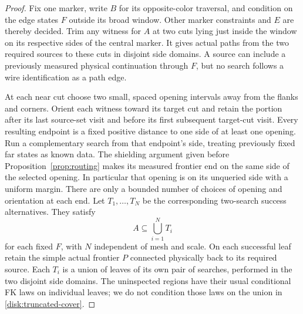 \begin{proof}
Fix one marker, write $B$ for its opposite-color traversal, and
condition on the edge states $F$ outside its broad window. Other
marker constraints and $E$ are thereby decided. Trim any witness
for $A$ at two cuts lying just inside the window on its respective
sides of the central marker. It gives actual paths from the two
required sources to these cuts in disjoint side domains. A source
can include a previously measured physical continuation through
$F$, but no search follows a wire identification as a path edge.

At each near cut choose two small, spaced opening intervals away
from the flanks and corners. Orient each witness toward its target
cut and retain the portion after its last source-set visit and before
its first subsequent target-cut visit. Every resulting endpoint is
a fixed positive distance to one side of at least one opening.
Run a complementary search from that endpoint's side, treating
previously fixed far states as known data. The shielding argument
given before Proposition~\ref{prop:routing} makes its measured
frontier end on the same side of the selected opening. In
particular that opening is on its unqueried side with a uniform
margin. There are only a bounded number of choices of opening and
orientation at each end. Let $T_1,\ldots,T_N$ be the corresponding
two-search success alternatives. They satisfy
\begin{equation}\label{disk:truncated-cover}
       A\subseteq\bigcup_{i=1}^N T_i
\end{equation}
for each fixed $F$, with $N$ independent of mesh and scale. On each
successful leaf retain the simple actual frontier $P$ connected
physically back to its required source. Each $T_i$ is a union of leaves
of its own pair of searches, performed in the two disjoint side
domains. The uninspected regions have their usual conditional FK laws
on individual leaves; we do not condition those laws on the union in
\eqref{disk:truncated-cover}.


\end{proof}
